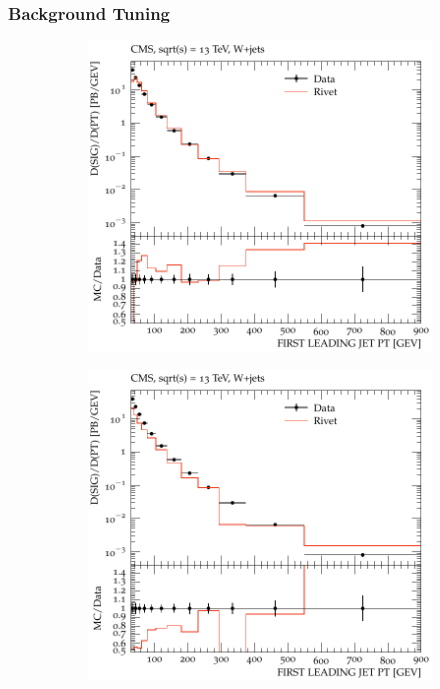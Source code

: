 \documentclass{beamer}
\begin{document}
\begin{frame}
\end{frame}


\begin{frame}
\frametitle{Background Tuning}


\begin{figure}[!h]

\begin{subfigure}[b]{0.44\textwidth}
\centering
\includegraphics[width=\textwidth]{pictures/MCTunig/FIRST_LEADING_JET_PT}
\caption{\label{FIRST_LEADING_JET_PTTune}}
\end{subfigure}
\begin{subfigure}[b]{0.44\textwidth}
\centering
\includegraphics[width=\textwidth]{pictures/MCTunig/FIRST_LEADING_JET_PT_Nelson}

\end{subfigure}
\end{figure}
\end{frame}
\end{document}
